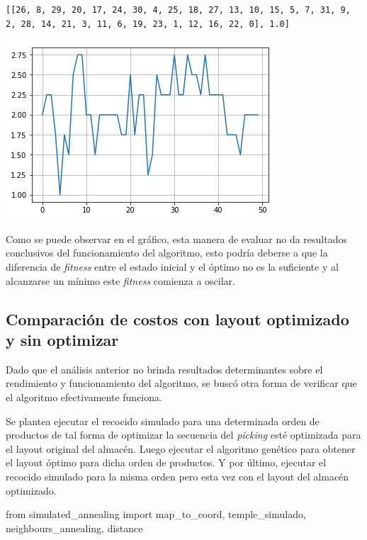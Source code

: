 \documentclass[
]{article}
\newenvironment{Shaded}{}{}
\newcommand{\ImportTok}[1]{#1}
\newcommand{\NormalTok}[1]{#1}
\begin{document}
\begin{verbatim}
[[26, 8, 29, 20, 17, 24, 30, 4, 25, 18, 27, 13, 10, 15, 5, 7, 31, 9, 2, 28, 14, 21, 3, 11, 6, 19, 23, 1, 12, 16, 22, 0], 1.0]
\end{verbatim}

\includegraphics{output_9_1.png}

Como se puede observar en el gráfico, esta manera de evaluar no da
resultados conclusivos del funcionamiento del algoritmo, esto podría
deberse a que la diferencia de \emph{fitness} entre el estado inicial y
el óptimo no es la suficiente y al alcanzarse un mínimo este
\emph{fitness} comienza a oscilar.

\hypertarget{comparaciuxf3n-de-costos-con-layout-optimizado-y-sin-optimizar}{%
\subsection{Comparación de costos con layout optimizado y sin
optimizar}\label{comparaciuxf3n-de-costos-con-layout-optimizado-y-sin-optimizar}}

Dado que el análisis anterior no brinda resultados determinantes sobre
el rendimiento y funcionamiento del algoritmo, se buscó otra forma de
verificar que el algoritmo efectivamente funciona.

Se plantea ejecutar el recocido simulado para una determinada orden de
productos de tal forma de optimizar la secuencia del \emph{picking} esté
optimizada para el layout original del almacén. Luego ejecutar el
algoritmo genético para obtener el layout óptimo para dicha orden de
productos. Y por último, ejecutar el recocido simulado para la misma
orden pero esta vez con el layout del almacén optimizado.

\begin{Shaded}
\begin{Highlighting}[]
\ImportTok{from}\NormalTok{ simulated_annealing }\ImportTok{import}\NormalTok{ map_to_coord, temple_simulado, neighbours_annealing, distance}
\end{Highlighting}
\end{Shaded}
\end{document}
